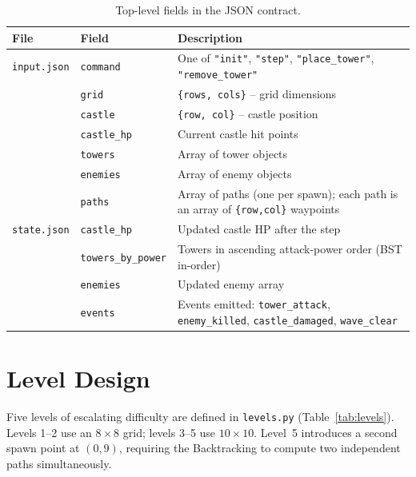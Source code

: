 \documentclass[12pt,a4paper]{report}
\begin{document}
\begin{table}[ht]
\centering
\caption{Top-level fields in the JSON contract.}
\label{tab:json}
\begin{tabularx}{\linewidth}{llX}
\toprule
\textbf{File} & \textbf{Field} & \textbf{Description} \\
\midrule
\texttt{input.json}
  & \texttt{command}    & One of \texttt{"init"}, \texttt{"step"},
                          \texttt{"place\_tower"}, \texttt{"remove\_tower"} \\
  & \texttt{grid}       & \texttt{\{rows, cols\}} -- grid dimensions \\
  & \texttt{castle}     & \texttt{\{row, col\}} -- castle position \\
  & \texttt{castle\_hp} & Current castle hit points \\
  & \texttt{towers}     & Array of tower objects \\
  & \texttt{enemies}    & Array of enemy objects \\
  & \texttt{paths}      & Array of paths (one per spawn); each path is an
                          array of \texttt{\{row,col\}} waypoints \\
\midrule
\texttt{state.json}
  & \texttt{castle\_hp}       & Updated castle HP after the step \\
  & \texttt{towers\_by\_power}& Towers in ascending attack-power order (BST in-order) \\
  & \texttt{enemies}          & Updated enemy array \\
  & \texttt{events}           & Events emitted: \texttt{tower\_attack},
                                \texttt{enemy\_killed}, \texttt{castle\_damaged},
                                \texttt{wave\_clear} \\
\bottomrule
\end{tabularx}
\end{table}

\section{Level Design}

Five levels of escalating difficulty are defined in \texttt{levels.py}
(Table~\ref{tab:levels}).
Levels 1--2 use an $8 \times 8$ grid; levels 3--5 use $10 \times 10$.
Level~5 introduces a second spawn point at $(0, 9)$, requiring the
Backtracking to compute two independent paths simultaneously.
\end{document}
